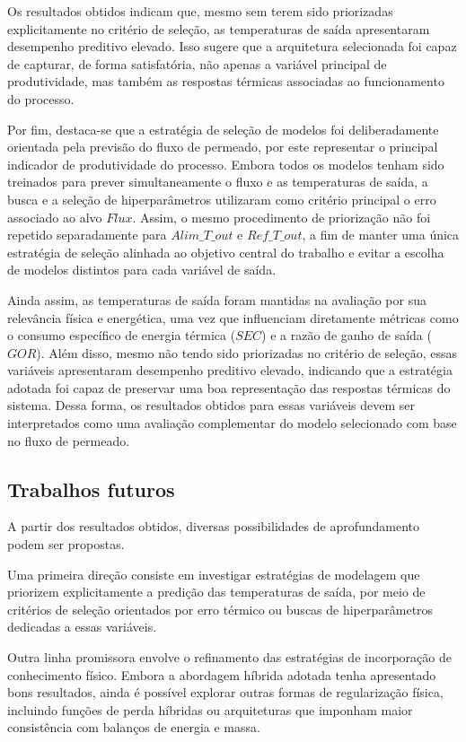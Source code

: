 Os resultados obtidos indicam que, mesmo sem terem sido priorizadas explicitamente no critério de seleção, as temperaturas de saída apresentaram desempenho preditivo elevado. Isso sugere que a arquitetura selecionada foi capaz de capturar, de forma satisfatória, não apenas a variável principal de produtividade, mas também as respostas térmicas associadas ao funcionamento do processo.


Por fim, destaca-se que a estratégia de seleção de modelos foi deliberadamente orientada pela previsão do fluxo de permeado, por este representar o principal indicador de produtividade do processo. Embora todos os modelos tenham sido treinados para prever simultaneamente o fluxo e as temperaturas de saída, a busca e a seleção de hiperparâmetros utilizaram como critério principal o erro associado ao alvo $Flux$. Assim, o mesmo procedimento de priorização não foi repetido separadamente para $Alim\_T\_out$ e $Ref\_T\_out$, a fim de manter uma única estratégia de seleção alinhada ao objetivo central do trabalho e evitar a escolha de modelos distintos para cada variável de saída.

Ainda assim, as temperaturas de saída foram mantidas na avaliação por sua relevância física e energética, uma vez que influenciam diretamente métricas como o consumo específico de energia térmica ($SEC$) e a razão de ganho de saída ($GOR$). Além disso, mesmo não tendo sido priorizadas no critério de seleção, essas variáveis apresentaram desempenho preditivo elevado, indicando que a estratégia adotada foi capaz de preservar uma boa representação das respostas térmicas do sistema. Dessa forma, os resultados obtidos para essas variáveis devem ser interpretados como uma avaliação complementar do modelo selecionado com base no fluxo de permeado.

\subsection{Trabalhos futuros}

A partir dos resultados obtidos, diversas possibilidades de aprofundamento podem ser propostas.

Uma primeira direção consiste em investigar estratégias de modelagem que priorizem explicitamente a predição das temperaturas de saída, por meio de critérios de seleção orientados por erro térmico ou buscas de hiperparâmetros dedicadas a essas variáveis.

Outra linha promissora envolve o refinamento das estratégias de incorporação de conhecimento físico. Embora a abordagem híbrida adotada tenha apresentado bons resultados, ainda é possível explorar outras formas de regularização física, incluindo funções de perda híbridas ou arquiteturas que imponham maior consistência com balanços de energia e massa.

